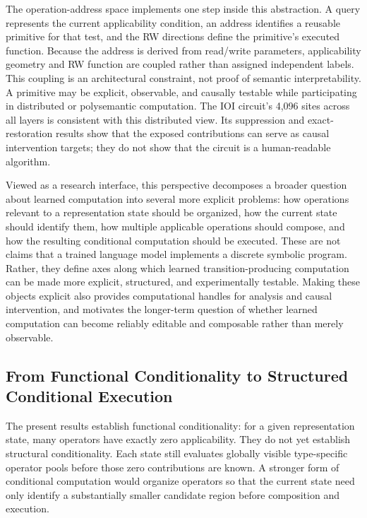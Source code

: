 \documentclass{article}
\begin{document}
The operation-address space implements one step inside this abstraction. A
query represents the current applicability condition, an address identifies a
reusable primitive for that test, and the RW directions define the primitive's
executed function. Because the address is derived from read/write parameters,
applicability geometry and RW function are coupled rather than assigned
independent labels. This coupling is an architectural constraint, not proof of
semantic interpretability. A primitive may be explicit, observable, and
causally testable while participating in distributed or polysemantic
computation. The IOI circuit's 4,096 sites across all layers is consistent with
this distributed view. Its suppression and exact-restoration results show that
the exposed contributions can serve as causal intervention targets; they do not
show that the circuit is a human-readable algorithm.

Viewed as a research interface, this perspective decomposes a broader question
about learned computation into several more explicit problems: how operations
relevant to a representation state should be organized, how the current state
should identify them, how multiple applicable operations should compose, and how
the resulting conditional computation should be executed. These are not claims
that a trained language model implements a discrete symbolic program. Rather,
they define axes along which learned transition-producing computation can be
made more explicit, structured, and experimentally testable. Making these
objects explicit also provides computational handles for analysis and causal
intervention, and motivates the longer-term question of whether learned
computation can become reliably editable and composable rather than merely
observable.

\subsection{From Functional Conditionality to Structured Conditional Execution}
\label{sec:future-low-d}

The present results establish functional conditionality: for a given
representation state, many operators have exactly zero applicability. They do
not yet establish structural conditionality. Each state still evaluates
globally visible type-specific operator pools before those zero contributions
are known. A stronger form of conditional computation would organize operators
so that the current state need only identify a substantially smaller candidate
region before composition and execution.
\end{document}
